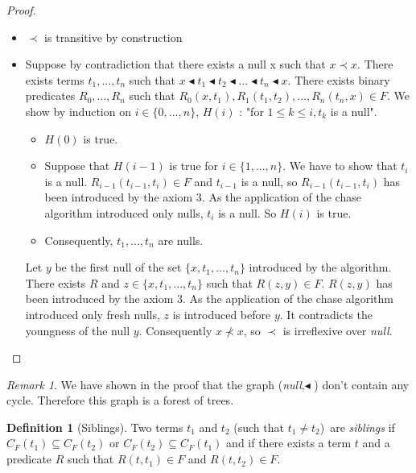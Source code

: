 \documentclass{article}
\theoremstyle{definition}
\newtheorem{definition}{Definition}[section]
\theoremstyle{remark}
\newtheorem{remark}{Remark}[section]
\begin{document}
\begin{proof}
\begin{itemize}
\item $\prec$ is transitive by construction
\item Suppose by contradiction that there exists a null x such that $x \prec x$. There exists terms $t_1,...,t_n$ such that $x \blacktriangleleft t_1 \blacktriangleleft t_2 \blacktriangleleft ... \blacktriangleleft t_n \blacktriangleleft x$. There exists binary predicates $R_0,...,R_n$ such that $R_0(x,t_1),R_1(t_1,t_2),...,R_n(t_n,x) \in F$. We show by induction on $i\in \{0,...,n\}$, $H(i)$ : "for $1 \leq k \leq i,t_k$ is a null".
\begin{itemize}
\item $H(0)$ is true.
\item Suppose that $H(i-1)$ is true for $i \in \{1,...,n\}$. We have to show that $t_i$ is a null. $R_{i-1}(t_{i-1},t_i) \in F$ and $t_{i-1}$ is a null, so $R_{i-1}(t_{i-1},t_i)$ has been introduced by the axiom 3. As the application of the chase algorithm introduced only nulls, $t_i$ is a null. So $H(i)$ is true.
\item Consequently, $t_1,...,t_n$ are nulls.
\end{itemize}
Let $y$ be the first null of the set $\{x,t_1,...,t_n\}$  introduced by the algorithm. There exists $R$ and $z \in \{x,t_1,...,t_n\}$ such that $R(z,y) \in F$. $R(z,y)$ has been introduced by the axiom 3. As the application of the chase algorithm introduced only fresh nulls, $z$ is introduced before $y$. It contradicts the youngness of the null $y$. Consequently $x \nprec x$, so $\prec$ is irreflexive over \emph{null}.
\end{itemize}
\end{proof}

\begin{remark}
We have shown in the proof that the graph (\emph{null},$\blacktriangleleft$ ) don't contain any cycle. Therefore this graph is a forest of trees.
\end{remark}

\begin{definition}[Siblings]
Two terms $t_1$ and $t_2$ (such that $t_1 \neq t_2$)\ are \emph{siblings} if $C_F(t_1) \subseteq C_F(t_2)$ or $C_F(t_2) \subseteq C_F(t_1)$ and if there exists a term $t$ and a predicate $R$ such that $R(t,t_1) \in F$ and $R(t,t_2) \in F$.
\end{definition}
\end{document}
